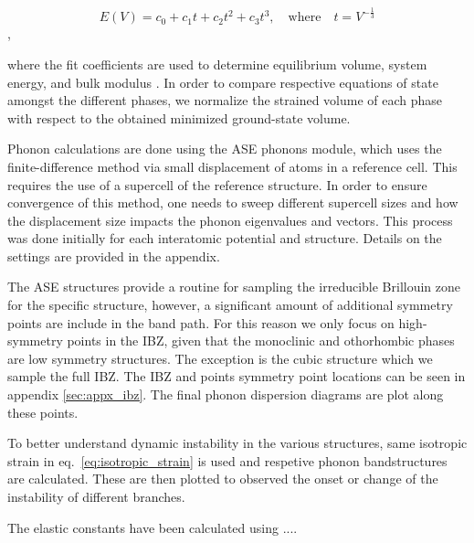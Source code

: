 \documentclass[preprint]{elsarticle}
\begin{document}
\begin{equation}
  \label{eq:eos_fit}
  E(V) = c_0 + c_1 t + c_2 t^2 + c_3 t^3, \quad \text{where} \quad t = V^{-\frac{1}{3}}
\end{equation},

where the fit coefficients are used to determine equilibrium volume, system energy, and bulk modulus \cite{Alchagirov2003}. In order to compare respective equations of state amongst the different phases, we normalize the strained volume of each phase with respect to the obtained minimized ground-state volume. \par

Phonon calculations are done using the ASE phonons module, which uses the finite-difference method via small displacement of atoms in a reference cell. This requires the use of a supercell of the reference structure. In order to ensure convergence of this method, one needs to sweep different supercell sizes and how the displacement size impacts the phonon eigenvalues and vectors. This process was done initially for each interatomic potential and structure. Details on the settings are provided in the appendix. \par

The ASE structures provide a routine for sampling the irreducible Brillouin zone for the specific structure, however, a significant amount of additional symmetry points are include in the band path. For this reason we only focus on high-symmetry points in the IBZ, given that the monoclinic and othorhombic phases are low symmetry structures. The exception is the cubic structure which we sample the full IBZ. The IBZ and points symmetry point locations can be seen in appendix \ref{sec:appx_ibz}. The final phonon dispersion diagrams are plot along these points. \par

To better understand dynamic instability in the various structures, same isotropic strain in eq.~\ref{eq:isotropic_strain} is used and respetive phonon bandstructures are calculated. These are then plotted to observed the onset or change of the instability of different branches. \par

The elastic constants have been calculated using ....
\end{document}
